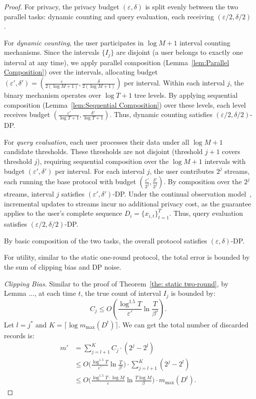 \begin{proof}
    For privacy, the privacy budget $(\varepsilon, \delta)$ is split evenly between the two parallel tasks: dynamic counting and query evaluation, each receiving $(\varepsilon/2, \delta/2)$.

For \emph{dynamic counting}, the user participates in $\log M+1$ interval counting mechanisms. Since the intervals $\{I_j\}$ are disjoint (a user belongs to exactly one interval at any time), we apply parallel composition (Lemma~\ref{lem:Parallel Composition}) over the intervals, allocating budget $(\varepsilon', \delta') = (\frac{\varepsilon}{2(\log M+1)}, \frac{\delta}{2(\log M+1)})$ per interval.
Within each interval $j$, the binary mechanism operates over $\log T+1$ tree levels. By applying sequential composition (Lemma~\ref{lem:Sequential Composition}) over these levels, each level receives budget $(\frac{\varepsilon'}{\log T+1}, \frac{\delta'}{\log T+1})$.
Thus, dynamic counting satisfies $(\varepsilon/2, \delta/2)$-DP.

For \emph{query evaluation}, each user processes their data under all $\log M+1$ candidate thresholds. These thresholds are not disjoint (threshold $j+1$ covers threshold $j$), requiring sequential composition over the $\log M+1$ intervals with budget $(\varepsilon', \delta')$ per interval.
For each interval $j$, the user contributes $2^j$ streams, each running the base protocol with budget $(\frac{\varepsilon'}{2^j}, \frac{\delta'}{2^j})$. By composition over the $2^j$ streams, interval $j$ satisfies $(\varepsilon', \delta')$-DP.
Under the continual observation model~\cite{dwork2010continual,chan2011private}, incremental updates to streams incur no additional privacy cost, as the guarantee applies to the user's complete sequence $D_i = \{x_{i,t}\}_{t=1}^T$.
Thus, query evaluation satisfies $(\varepsilon/2, \delta/2)$-DP.

By basic composition of the two tasks, the overall protocol satisfies $(\varepsilon, \delta)$-DP.


For utility, similar to the static one-round protocol, the total error is bounded by the sum of clipping bias and DP noise.



\emph{Clipping Bias.}
Similar to the proof of Theorem~\ref{the: static two-round}, by Lemma ..., at each time $t$, the true count of interval $I_j$ is bounded by:
\[
C_j \le O(\frac{\log^{1.5} T}{\varepsilon'}\ln \frac{T}{\beta'}).
\]
Let $l = j^*$ and $K = \lceil \log m_{\max}(D^t) \rceil$. We can get the total number of discarded records is:
\[
\begin{aligned}
m'
&= \sum_{j=l+1}^{K} C_j \cdot (2^j - 2^l) \\
&\le O\Big(\frac{\log ^{1.5} T}{\varepsilon'} \ln \frac{T}{\beta'}\Big) \cdot \sum_{j=l+1}^{K} (2^j - 2^l) \\
&\le O\Big(\frac{\log ^{1.5} T \cdot \log M}{\varepsilon} \ln \frac{T\log M}{\beta}\Big) \cdot m_{\max}(D^t).
\end{aligned}
\]





\end{proof}
